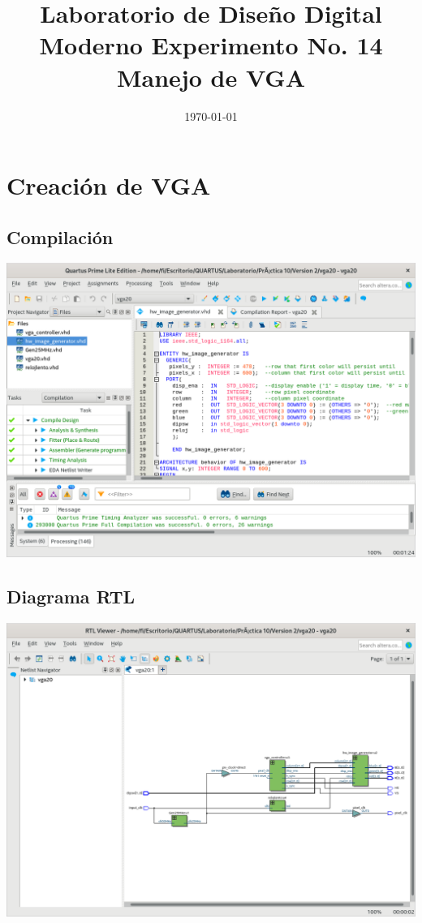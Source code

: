\documentclass[10pt,a4paper]{article}
\title{Laboratorio de Diseño Digital Moderno Experimento No. 14 Manejo de VGA}
\author{}
\date{\today}
\begin{document}
	\maketitle
	
	\section{Creación de VGA}
	\subsection{Compilación}
	\begin{center}
		\includegraphics[scale=0.35]{Compilacion.png}
	\end{center}
	
	\subsection{Diagrama RTL}
	\begin{center}
		\includegraphics[scale=0.35]{RTL.png}
	\end{center}
	
\end{document}
